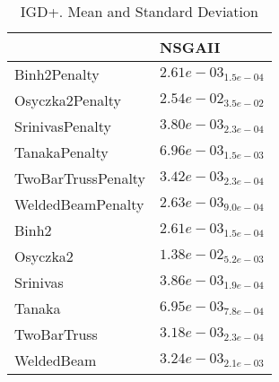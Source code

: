 \documentclass{article}
\begin{document}
\begin{table}
\caption{IGD+. Mean and Standard Deviation}
\label{table: IGD+}
\centering
\begin{scriptsize}
\begin{tabular}{ll}
\hline &  NSGAII\\
\hline 
Binh2Penalty & \cellcolor{gray95}$  2.61e-03_{ 1.5e-04}$ \\
Osyczka2Penalty & \cellcolor{gray95}$  2.54e-02_{ 3.5e-02}$ \\
SrinivasPenalty & \cellcolor{gray95}$  3.80e-03_{ 2.3e-04}$ \\
TanakaPenalty & \cellcolor{gray95}$  6.96e-03_{ 1.5e-03}$ \\
TwoBarTrussPenalty & \cellcolor{gray95}$  3.42e-03_{ 2.3e-04}$ \\
WeldedBeamPenalty & \cellcolor{gray95}$  2.63e-03_{ 9.0e-04}$ \\
Binh2 & \cellcolor{gray95}$  2.61e-03_{ 1.5e-04}$ \\
Osyczka2 & \cellcolor{gray95}$  1.38e-02_{ 5.2e-03}$ \\
Srinivas & \cellcolor{gray95}$  3.86e-03_{ 1.9e-04}$ \\
Tanaka & \cellcolor{gray95}$  6.95e-03_{ 7.8e-04}$ \\
TwoBarTruss & \cellcolor{gray95}$  3.18e-03_{ 2.3e-04}$ \\
WeldedBeam & \cellcolor{gray95}$  3.24e-03_{ 2.1e-03}$ \\
\hline
\end{tabular}
\end{scriptsize}
\end{table}
\end{document}
